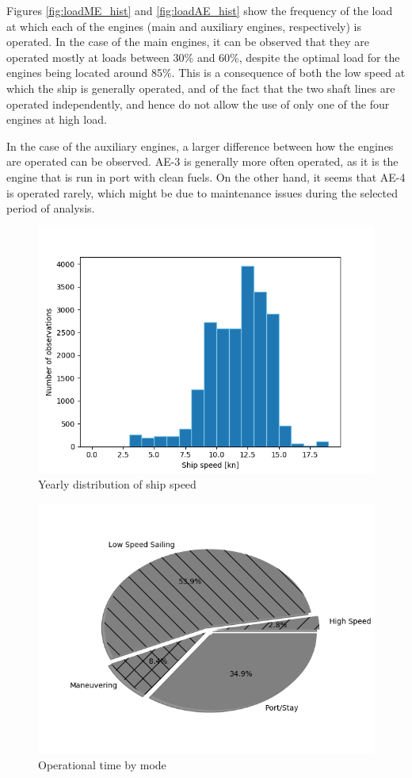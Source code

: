 \documentclass[preprint,12pt]{elsarticle}
\begin{document}
Figures \ref{fig:loadME_hist} and \ref{fig:loadAE_hist} show the frequency of the load at which each of the engines (main and auxiliary engines, respectively) is operated. In the case of the main engines, it can be observed that they are operated mostly at loads between 30\% and 60\%, despite the optimal load for the engines being located around 85\%. This is a consequence of both the low speed at which the ship is generally operated, and of the fact that the two shaft lines are operated independently, and hence do not allow the use of only one of the four engines at high load. 

In the case of the auxiliary engines, a larger difference between how the engines are operated can be observed. AE-3 is generally more often operated, as it is the engine that is run in port with clean fuels. On the other hand, it seems that AE-4 is operated rarely, which might be due to maintenance issues during the selected period of analysis.

\begin{figure}[htbp]
	\centering
	\includegraphics[width=0.8\linewidth]{Figures/vship_hist}
	\caption{Yearly distribution of ship speed}
	\label{fig:vship_hist}
\end{figure}

\begin{figure}[htbp]
	\centering
	\includegraphics[width=0.8\linewidth]{Figures/Pie_operationalMode}
	\caption{Operational time by mode}
	\label{fig:opMode_pie}
\end{figure}
\end{document}

